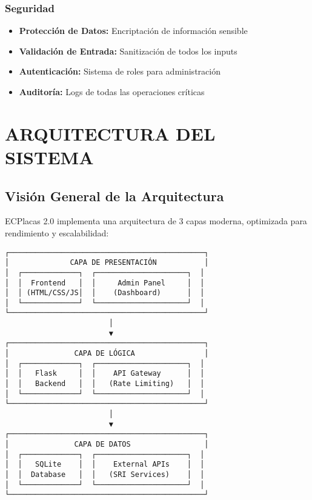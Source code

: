 \documentclass[12pt,a4paper]{article}
\begin{document}
\subsubsection{Seguridad}
\begin{itemize}
    \item \textbf{Protección de Datos:} Encriptación de información sensible
    \item \textbf{Validación de Entrada:} Sanitización de todos los inputs
    \item \textbf{Autenticación:} Sistema de roles para administración
    \item \textbf{Auditoría:} Logs de todas las operaciones críticas
\end{itemize}

\section{ARQUITECTURA DEL SISTEMA}

\subsection{Visión General de la Arquitectura}

ECPlacas 2.0 implementa una arquitectura de 3 capas moderna, optimizada para rendimiento y escalabilidad:

\begin{verbatim}
┌─────────────────────────────────────────────┐
│              CAPA DE PRESENTACIÓN           │
│  ┌─────────────┐  ┌─────────────────────┐  │
│  │  Frontend   │  │     Admin Panel     │  │
│  │ (HTML/CSS/JS│  │    (Dashboard)      │  │
│  └─────────────┘  └─────────────────────┘  │
└─────────────────────────────────────────────┘
                        │
                        ▼
┌─────────────────────────────────────────────┐
│               CAPA DE LÓGICA                │
│  ┌─────────────┐  ┌─────────────────────┐  │
│  │   Flask     │  │    API Gateway      │  │
│  │   Backend   │  │   (Rate Limiting)   │  │
│  └─────────────┘  └─────────────────────┘  │
└─────────────────────────────────────────────┘
                        │
                        ▼
┌─────────────────────────────────────────────┐
│               CAPA DE DATOS                 │
│  ┌─────────────┐  ┌─────────────────────┐  │
│  │   SQLite    │  │    External APIs    │  │
│  │  Database   │  │   (SRI Services)    │  │
│  └─────────────┘  └─────────────────────┘  │
└─────────────────────────────────────────────┘
\end{verbatim}
\end{document}
